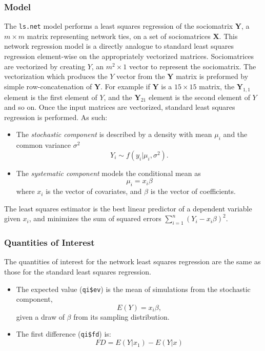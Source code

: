 \subsubsection{Model}
The {\tt ls.net} model performs a least squares regression of the
sociomatrix $\mathbf{Y}$, a $m \times m$ matrix representing network
ties, on a set of sociomatrices $\mathbf{X}$. This network regression
model is a directly analogue to standard least squares regression
element-wise on the appropriately vectorized matrices. Sociomatrices
are vectorized by creating $Y$, an $m^{2} \times 1$ vector to
represent the sociomatrix. The vectorization which produces the $Y$
vector from the $\mathbf{Y}$ matrix is preformed by simple
row-concatenation of $\mathbf{Y}$. For example if $\mathbf{Y}$ is a
$15 \times 15$ matrix, the $\mathbf{Y}_{1,1}$ element is the first
element of $Y$, and the $\mathbf{Y}_{21}$ element is the second
element of $Y$ and so on. Once the input matrices are vectorized,
standard least squares regression is performed. As such:
\begin{itemize}
\item The \emph{stochastic component} is described by a density with
mean $\mu_{i}$ and the common variance $\sigma^{2}$ 
\begin{equation*}
Y_{i} \sim f(y_{i} | \mu_{i}, \sigma^{2}).
\end{equation*}

\item The \emph{systematic component} models the conditional mean as
\begin{equation*}
\mu_{i} = x_{i}\beta
\end{equation*}
where $x_{i}$ is the vector of covariates, and $\beta$ is the vector of coefficients.
\end{itemize}
The least squares estimator is the best linear predictor of a
dependent variable given $x_{i}$, and minimizes the sum of squared
errors $\sum_{i = 1}^{n} (Y_{i} - x_{i}\beta)^{2}$.

\subsubsection{Quantities of Interest}
The quantities of interest for the network least squares regression
are the same as those for the standard least squares regression.
\begin{itemize}
\item The expected value ({\tt qi\$ev}) is the mean of simulations from
the stochastic component, 
\begin{equation*}
E(Y) = x_{i}\beta,
\end{equation*}
given a draw of $\beta$ from its sampling distribution.

\item The first difference ({\tt qi\$fd}) is:
\begin{equation*}
FD = E(Y | x_{1}) - E(Y | x)
\end{equation*}
\end{itemize}

